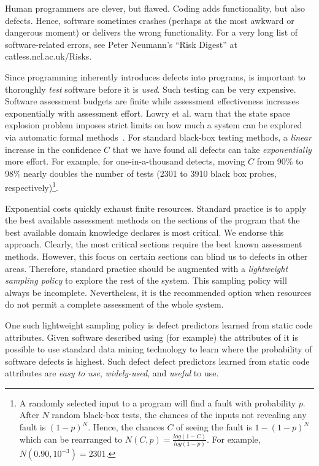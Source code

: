 
Human programmers are clever, but flawed. Coding  adds functionality, but also defects.
Hence, software sometimes crashes (perhaps at the most awkward or dangerous moment) or delivers
the wrong functionality. For a very long list of software-related errors,
see  Peter Neumann's ``Risk Digest'' at catless.ncl.ac.uk/Risks.

Since programming inherently
introduces defects into  programs, is important to thoroughly {\em test} software before it is {\em used}.
Such testing  can be very expensive.
Software assessment budgets are finite
while assessment effectiveness increases 
exponentially with assessment effort.
Lowry et al. warn that  
the state space explosion problem imposes
strict limits on how much a system can be explored
via automatic formal methods~\cite{lowrey98}.
For standard black-box testing methods,
a {\em linear} increase
in the confidence $C$ that we have found all defects
can take {\em exponentially} more effort.
For example, for one-in-a-thousand detects,
moving $C$ from  
90\% to 98\% nearly doubles the number of  tests (2301 to   3910 black box
probes, respectively)\footnote{A randomly selected 
input to a program will find a fault with probability $p$.
After $N$ random black-box tests, the chances of the inputs 
not revealing any fault 
is $(1-p)^N$. Hence, the chances $C$ of seeing the fault is $1-(1-p)^N$
which can be rearranged to 
 $N(C,p)=\frac{log(1 -
C)}{log(1-p)}$. For example, $N(0.90,10^{-3})=2301$.}.

Exponential costs quickly exhaust finite resources.
Standard practice is to apply the best
available assessment methods on the sections of the program that the
best available domain knowledge declares is most critical.  We endorse
this approach.  Clearly, the most critical sections require the best
known assessment methods. However, this focus on certain sections
can blind us to defects in other areas.
Therefore, standard practice should be augmented
with a  {\em
lightweight sampling policy} to explore the rest of the system.  This
sampling policy will always be incomplete.
Nevertheless, it is the recommended option when
resources do not permit a complete assessment of the whole system.

One such lightweight sampling policy is defect predictors learned from static code attributes.
Given software described using (for example) the attributes of  it is possible
to use standard data mining technology to learn where the probability of software defects is highest.
Such defect  defect predictors learned from
static code attributes are   {\em easy to
use}, {\em widely-used}, and {\em useful} to use.

